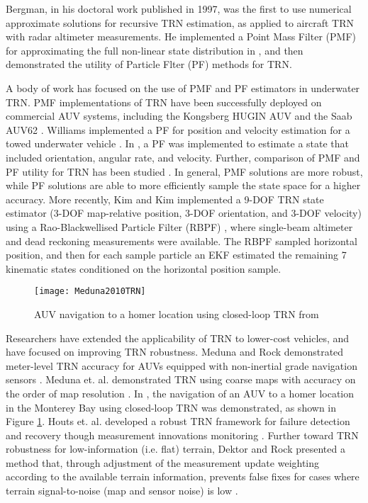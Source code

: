 Bergman, in his doctoral work published in 1997, was the first to use numerical approximate solutions for recursive TRN estimation, as applied to aircraft TRN with radar altimeter measurements.
He implemented a Point Mass Filter (PMF) for approximating the full non-linear state distribution in \cite{Bergman97bayesianinference}, and then demonstrated the utility of Particle Flter (PF) methods for TRN.

A body of work has focused on the use of PMF and PF estimators in underwater TRN.
PMF implementations of TRN have been successfully deployed on commercial AUV systems, including the Kongsberg HUGIN AUV \cite{Hagen2010} and the Saab AUV62 \cite{Carlstrom2005}.
Williams implemented a PF for position and velocity estimation for a towed underwater vehicle \cite{Williams2006}.  
In \cite{Karlsson2003a}, a PF was implemented to estimate a state that included orientation, angular rate, and velocity.
Further, comparison of PMF and PF utility for TRN has been studied \cite{Anonsen2006}.
In general, PMF solutions are more robust, while PF solutions are able to more efficiently sample the state space for a higher accuracy.
More recently, Kim and Kim \cite{Kim2014} implemented a 9-DOF TRN state estimator (3-DOF map-relative position, 3-DOF orientation, and 3-DOF velocity) using a Rao-Blackwellised Particle Filter (RBPF) \cite{Doucet2000}, where single-beam altimeter and dead reckoning measurements were available.
The RBPF sampled horizontal position, and then for each sample particle an EKF estimated the remaining 7 kinematic states conditioned on the horizontal position sample.

\begin{figure}[!h!]
	\centering
		\texttt{[image: Meduna2010TRN]}
	\caption{AUV navigation to a homer location using closed-loop TRN from \cite{Meduna2010}}
	\label{fig:Meduna2010}
\end{figure}

Researchers have extended the applicability of TRN to lower-cost vehicles, and have focused on improving TRN robustness.
Meduna and Rock demonstrated meter-level TRN accuracy for AUVs equipped with non-inertial grade navigation sensors \cite{Meduna2008}.
Meduna et. al. demonstrated TRN using coarse maps with accuracy on the order of map resolution \cite{Meduna2009}.
In \cite{Meduna2010}, the navigation of an AUV to a homer location in the Monterey Bay using  closed-loop TRN was demonstrated, as shown in Figure \ref{fig:Meduna2010}.
Houts et. al. developed a robust TRN framework for failure detection and recovery though measurement innovations monitoring \cite{Houts2013}.
Further toward TRN robustness for low-information (i.e. flat) terrain, Dektor and Rock presented a method that, through adjustment of the measurement update weighting according to the available terrain information, prevents false fixes for cases where terrain signal-to-noise (map and sensor noise) is low \cite{Dektor2012}.

